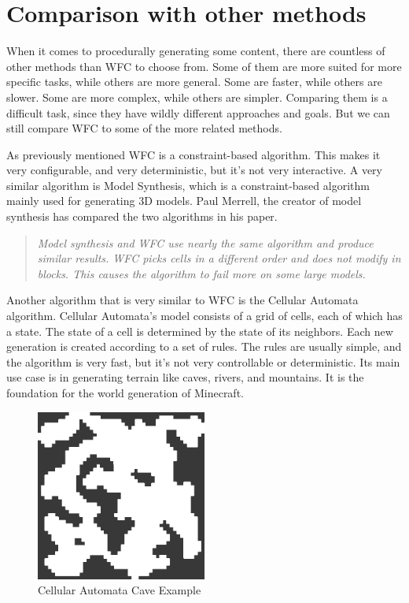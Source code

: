 \documentclass[10pt,oneside,a4paper]{article}
\begin{document}
\section{Comparison with other methods}\label{sec:comparison}
When it comes to procedurally generating some content, there are countless of other methods than WFC to choose from.
Some of them are more suited for more specific tasks, while others are more general.
Some are faster, while others are slower. Some are more complex, while others are simpler.
Comparing them is a difficult task, since they have wildly different approaches and goals.
But we can still compare WFC to some of the more related methods.

As previously mentioned WFC is a constraint-based algorithm. This makes it very configurable, and very deterministic, but it's not very interactive.
A very similar algorithm is Model Synthesis, which is a constraint-based algorithm mainly used for generating 3D models.
Paul Merrell, the creator of model synthesis has compared the two algorithms in his paper\cite{Mer21}.
\begin{quote}
    \textit{Model synthesis and WFC use nearly the same algorithm and produce similar results. WFC picks cells in a different
order and does not modify in blocks. This causes the algorithm to fail more on some large models.}
\end{quote}

Another algorithm that is very similar to WFC is the Cellular Automata algorithm.
Cellular Automata's model consists of a grid of cells, each of which has a state.
The state of a cell is determined by the state of its neighbors. Each new generation is created according to a set of rules.
The rules are usually simple, and the algorithm is very fast, but it's not very controllable or deterministic.
Its main use case is in generating terrain like caves, rivers, and mountains. It is the foundation for the world generation of Minecraft.

\begin{figure}[!h]
    \centering
    \includegraphics[width=0.5\textwidth]{figures/cellular-automata-cave.png}
    \caption{Cellular Automata Cave Example}\label{fig:cellular_automata}
\end{figure}
\end{document}
